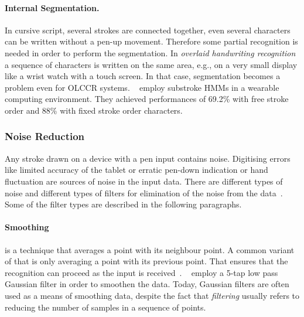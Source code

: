 \paragraph{Internal Segmentation.}
\label{sec:internalsegmentation}
In cursive script, several strokes are connected together, even several 
characters can be written without a pen-up movement. Therefore some partial 
recognition is needed in order to perform the segmentation.
In \emph{overlaid handwriting recognition} a sequence of characters is written 
on the same area, e.g., on a very small display like a wrist watch with a touch 
screen. In that case, segmentation becomes a problem even for OLCCR systems.
~\citeyear{Shimodaira2003} employ substroke HMMs in a wearable computing 
environment. They achieved performances of 69.2\% with free stroke order
and 88\% with fixed stroke order characters.

\subsubsection{Noise Reduction} 
\label{sec:noisereduction}
Any stroke drawn on a device with a pen input contains noise. Digitising errors
like limited accuracy of the tablet or erratic pen-down indication or hand 
fluctuation are sources of noise in the input data.  There are different types 
of noise and different types of filters for elimination of the noise from the 
data~. Some of the filter types are described in the 
following paragraphs.

\paragraph{Smoothing}
\label{sec:smoothing}
is a technique that averages a point with its 
neighbour point. A common variant of that is only averaging a point with its
previous point. That ensures that the recognition can proceed as the input
is received~. 
~\citeyear{Joshi2005} employ a 5-tap low 
pass Gaussian filter in order to smoothen the data. Today, Gaussian filters are 
often used as a means of smoothing data, despite the fact that \emph{filtering}
usually refers to reducing the number of samples in a sequence of points.

